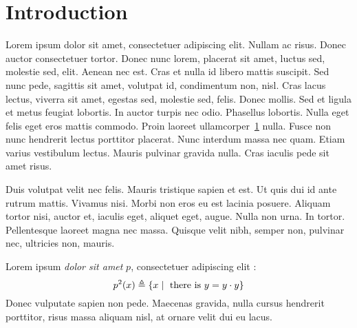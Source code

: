 \documentclass[twoside,article,a4paper,12pt,leqno]{memoir}
\title{\mytitle}
\author{\myauthor}
\date{\small Draft of \today}
\begin{document}

\begin{titlingpage}
\maketitle
\begin{abstract}
Lorem ipsum dolor sit amet, consectetur adipisicing elit, sed do
eiusmod tempor incididunt ut labore et dolore magna aliqua. Ut enim ad
minim veniam, quis nostrud exercitation ullamco laboris nisi ut
aliquip ex ea commodo consequat. Duis aute irure dolor in
reprehenderit in voluptate velit esse cillum dolore eu fugiat nulla
pariatur. Excepteur sint occaecat cupidatat non proident, sunt in
culpa qui officia deserunt mollit anim id est laborum.
\end{abstract}
\end{titlingpage}

\chapter{Introduction}\label{sec:intro}

Lorem ipsum dolor sit amet, consectetuer adipiscing elit. Nullam ac
risus. Donec auctor consectetuer tortor. Donec nunc lorem, placerat
sit amet, luctus sed, molestie sed, elit. Aenean nec est. Cras et
nulla id libero mattis suscipit. Sed nunc pede, sagittis sit amet,
volutpat id, condimentum non, nisl. Cras lacus lectus, viverra sit
amet, egestas sed, molestie sed, felis. Donec mollis. Sed et ligula et
metus feugiat lobortis. In auctor turpis nec odio. Phasellus
lobortis. Nulla eget felis eget eros mattis commodo. Proin laoreet
ullamcorper~\ref{sec:intro} nulla. Fusce non nunc hendrerit lectus
porttitor placerat. Nunc interdum massa nec quam. Etiam varius
vestibulum lectus. Mauris pulvinar gravida nulla. Cras iaculis pede
sit amet risus.

Duis volutpat velit nec felis. Mauris tristique sapien et est. Ut quis
dui id ante rutrum mattis. Vivamus nisi. Morbi non eros eu est lacinia
posuere. Aliquam tortor nisi, auctor et, iaculis eget, aliquet eget,
augue. Nulla non urna. In tortor. Pellentesque laoreet magna nec
massa. Quisque velit nibh, semper non, pulvinar nec, ultricies non,
mauris.

\begin{definition}[Defined]\label{def:bli}
Lorem ipsum \emph{dolor sit amet} $p$, consectetuer adipiscing
elit :
\begin{displaymath}
  p^2(x)\triangleq \left\{ x\mid \text{ there is } y = y \cdot y  \right\}
\end{displaymath}
Donec vulputate sapien non
pede. Maecenas
gravida, nulla cursus hendrerit porttitor, risus massa aliquam nisl,
at ornare velit dui eu lacus.
\end{definition}
\end{document}
